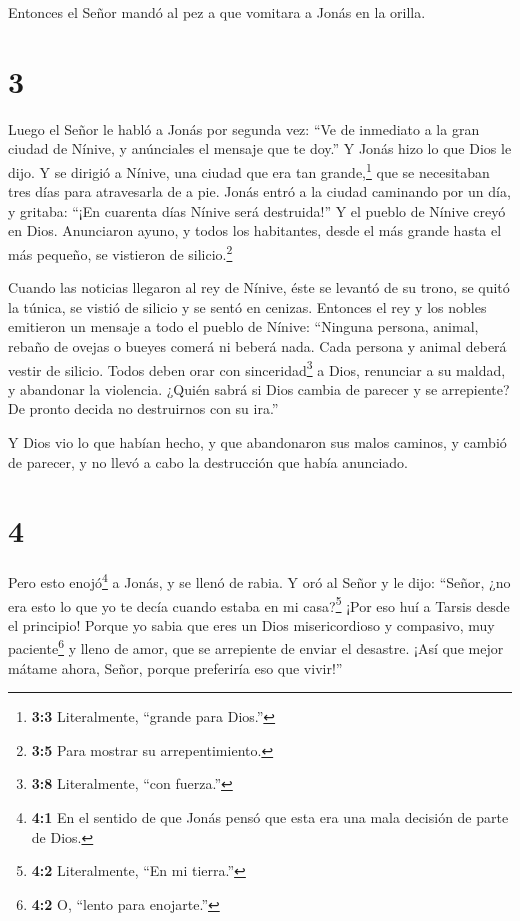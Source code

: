  Entonces el Señor mandó al pez a que vomitara a Jonás en
la orilla.

\hypertarget{section-2}{%
\section{3}\label{section-2}}

 Luego el Señor le habló a Jonás por segunda vez:
 ``Ve de inmediato a la gran ciudad de Nínive, y anúnciales
el mensaje que te doy.''  Y Jonás hizo lo que Dios le dijo.
Y se dirigió a Nínive, una ciudad que era tan grande,\footnote{\textbf{3:3}
  Literalmente, ``grande para Dios.''} que se necesitaban tres días para
atravesarla de a pie.  Jonás entró a la ciudad caminando por
un día, y gritaba: ``¡En cuarenta días Nínive será destruida!''
 Y el pueblo de Nínive creyó en Dios. Anunciaron ayuno, y
todos los habitantes, desde el más grande hasta el más pequeño, se
vistieron de silicio.\footnote{\textbf{3:5} Para mostrar su
  arrepentimiento.}

 Cuando las noticias llegaron al rey de Nínive, éste se
levantó de su trono, se quitó la túnica, se vistió de silicio y se sentó
en cenizas.  Entonces el rey y los nobles emitieron un
mensaje a todo el pueblo de Nínive: ``Ninguna persona, animal, rebaño de
ovejas o bueyes comerá ni beberá nada.  Cada persona y
animal deberá vestir de silicio. Todos deben orar con
sinceridad\footnote{\textbf{3:8} Literalmente, ``con fuerza.''} a Dios,
renunciar a su maldad, y abandonar la violencia.  ¿Quién
sabrá si Dios cambia de parecer y se arrepiente? De pronto decida no
destruirnos con su ira.''

 Y Dios vio lo que habían hecho, y que abandonaron sus
malos caminos, y cambió de parecer, y no llevó a cabo la destrucción que
había anunciado.

\hypertarget{section-3}{%
\section{4}\label{section-3}}

 Pero esto enojó\footnote{\textbf{4:1} En el sentido de que
  Jonás pensó que esta era una mala decisión de parte de Dios.} a Jonás,
y se llenó de rabia.  Y oró al Señor y le dijo: ``Señor, ¿no
era esto lo que yo te decía cuando estaba en mi casa?\footnote{\textbf{4:2}
  Literalmente, ``En mi tierra.''} ¡Por eso huí a Tarsis desde el
principio! Porque yo sabia que eres un Dios misericordioso y compasivo,
muy paciente\footnote{\textbf{4:2} O, ``lento para enojarte.''} y lleno
de amor, que se arrepiente de enviar el desastre.  ¡Así que
mejor mátame ahora, Señor, porque preferiría eso que vivir!''

